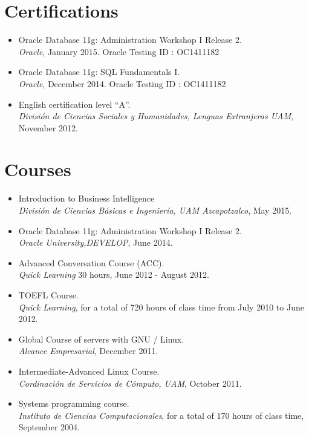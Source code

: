 \documentclass[21pt, onecolumn]{article} %
\begin{document}
\section*{Certifications}
\begin{itemize}
 \item Oracle Database 11g: Administration Workshop I Release 2.\\
 \emph{Oracle},
January 2015. Oracle Testing ID :  OC1411182 
 \item Oracle Database 11g: SQL Fundamentals I.\\
 \emph{Oracle},
December 2014. Oracle Testing ID :  OC1411182 
 \item English certification level ``A''.\\
 \emph{División de Ciencias Sociales y Humanidades, Lenguas Extranjeras UAM},
November 2012.
\end{itemize}


\section*{Courses}


\begin{itemize}
 \item Introduction to Business Intelligence\\
 \emph{División de Ciencias Básicas e Ingeniería,  UAM Azcapotzalco},
May 2015.
 \item Oracle Database 11g: Administration Workshop I Release 2.\\
 \emph{Oracle University,DEVELOP},
 June 2014.
 \item Advanced Conversation Course (ACC).\\
 \emph{Quick Learning} 30 hours, June 2012 - August 2012.
 \item TOEFL Course.\\
 \emph{Quick Learning}, for a total of 720 hours of class time from July 2010 to
June 2012.
 \item Global Course of servers with GNU / Linux.\\
  \emph{Alcance Empresarial}, December 2011.
 \item Intermediate-Advanced Linux Course.\\
  \emph{Cordinación de Servicios de Cómputo, UAM}, October 2011.
 \item Systems programming course.\\
  \emph{Instituto de Ciencias Computacionales}, for a total of 170 hours of
class time, September 2004.
\end{itemize}
\end{document}
